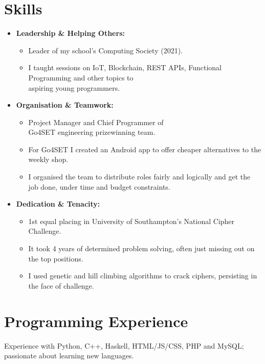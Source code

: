 \documentclass{Resume2}
\begin{document}
	\section{Skills}
			\begin{itemize}
				\item \textbf{Leadership \& Helping Others:} 
				    \begin{itemize}
				        \item Leader of my school's Computing Society (2021).
				        \item I taught sessions on IoT, Blockchain, REST APIs, Functional Programming and other topics to \\ aspiring young programmers.
				    \end{itemize} 
				\item \textbf{Organisation \& Teamwork:} 
				    \begin{itemize}
				        \item Project Manager and Chief Programmer of \\ Go4SET engineering prizewinning team.
				        \item For Go4SET I created an Android app to offer cheaper alternatives to the weekly shop.
				        \item I organised the team to distribute roles fairly and logically and get the job done, under time and budget constraints.
				    \end{itemize}
				\item \textbf{Dedication \& Tenacity:}
				    \begin{itemize}
				        \item 1st equal placing in University of Southampton's National Cipher Challenge.
				        \item It took 4 years of determined problem solving, often just missing out on the top positions.
				        \item I used genetic and hill climbing algorithms to crack ciphers, persisting in the face of challenge.
				    \end{itemize}
			\end{itemize}		

	\section{Programming Experience}
			Experience with Python, C++, Haskell, HTML/JS/CSS, PHP and MySQL; passionate about learning new languages.
\end{document}
